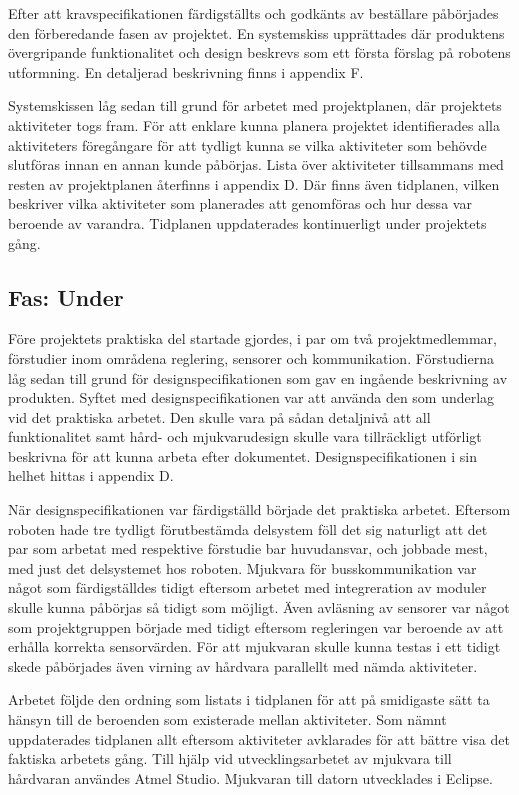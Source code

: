 \documentclass[11pt]{article}
\begin{document}
\begin{flushleft}
Efter att kravspecifikationen färdigställts och godkänts av beställare påbörjades den förberedande fasen av projektet. En systemskiss upprättades där produktens övergripande funktionalitet och design beskrevs som ett första förslag på robotens utformning. En detaljerad beskrivning finns i appendix F. 

Systemskissen låg sedan till grund för arbetet med projektplanen, där projektets aktiviteter togs fram. För att enklare kunna planera projektet identifierades alla aktiviteters föregångare för att tydligt kunna se vilka aktiviteter som behövde slutföras innan en annan kunde påbörjas. Lista över aktiviteter tillsammans med resten av projektplanen återfinns i appendix D. Där finns även tidplanen, vilken beskriver vilka aktiviteter som planerades att genomföras och hur dessa var beroende av varandra. Tidplanen uppdaterades kontinuerligt under projektets gång.

\subsection{Fas: Under}
Före projektets praktiska del startade gjordes, i par om två projektmedlemmar, förstudier inom områdena reglering, sensorer och kommunikation. Förstudierna låg sedan till grund för designspecifikationen som gav en ingående beskrivning av produkten. Syftet med designspecifikationen var att använda den som underlag vid det praktiska arbetet. Den skulle vara på sådan detaljnivå att all funktionalitet samt hård- och mjukvarudesign skulle vara tillräckligt utförligt beskrivna för att kunna arbeta efter dokumentet. Designspecifikationen i sin helhet hittas i appendix D. 

När designspecifikationen var färdigställd började det praktiska arbetet. Eftersom roboten hade tre tydligt förutbestämda delsystem föll det sig naturligt att det par som arbetat med respektive förstudie bar huvudansvar, och jobbade mest, med just det delsystemet hos roboten. Mjukvara för busskommunikation var något som färdigställdes tidigt eftersom arbetet med integreration av moduler skulle kunna påbörjas så tidigt som möjligt. Även avläsning av sensorer var något som projektgruppen började med tidigt eftersom regleringen var beroende av att erhålla korrekta sensorvärden. För att mjukvaran skulle kunna testas i ett tidigt skede påbörjades även virning av hårdvara parallellt med nämda aktiviteter. 

Arbetet följde den ordning som listats i tidplanen för att på smidigaste sätt ta hänsyn till de beroenden som existerade mellan aktiviteter. Som nämnt uppdaterades tidplanen allt eftersom aktiviteter avklarades för att bättre visa det faktiska arbetets gång. Till hjälp vid utvecklingsarbetet av mjukvara till hårdvaran användes Atmel Studio. Mjukvaran till datorn utvecklades i Eclipse. 


\end{flushleft}
\end{document}
